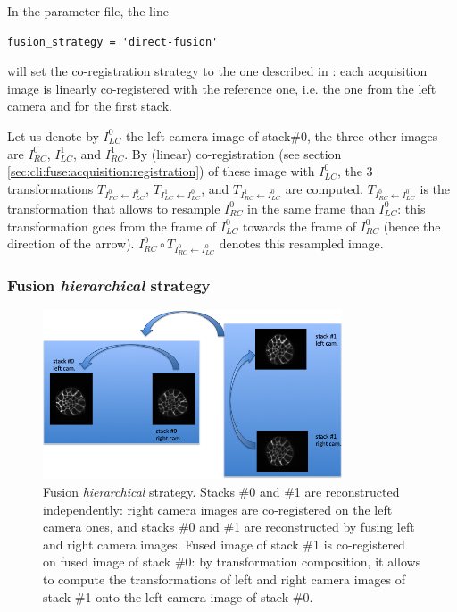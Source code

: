 In the parameter file, the line
\begin{verbatim}
fusion_strategy = 'direct-fusion'
\end{verbatim}
will set the co-registration strategy to the one described in \cite{guignard:tel-01278725,guignard:hal-02903409}: each acquisition image is linearly co-registered with the reference one, i.e. the one from the left camera and for the first stack.

Let us denote by $I^{0}_{LC}$ the left camera image of stack\#0, the three other images are $I^{0}_{RC}$, $I^{1}_{LC}$, and $I^{1}_{RC}$. By (linear) co-registration (see section \ref{sec:cli:fuse:acquisition:registration}) of these image with $I^{0}_{LC}$, the 3 transformations
$T_{I^{0}_{RC} \leftarrow I^{0}_{LC}}$,
$T_{I^{1}_{LC} \leftarrow I^{0}_{LC}}$, and
$T_{I^{1}_{RC} \leftarrow I^{0}_{LC}}$
are computed.
$T_{I^{0}_{RC} \leftarrow I^{0}_{LC}}$ is the transformation that allows to resample $I^{0}_{RC}$ in the same frame than $I^{0}_{LC}$: this transformation goes from the frame of $I^{0}_{LC}$ towards the frame of $I^{0}_{RC}$ (hence the direction of the arrow).
$I^{0}_{RC} \circ T_{I^{0}_{RC} \leftarrow I^{0}_{LC}}$ denotes this resampled image.


\subsubsection{Fusion \textit{hierarchical} strategy}

\begin{figure}
\begin{center}
\includegraphics[height=50mm]{figures/fusion-hierarchical-strategy.png}  
\end{center}
\caption{\label{fig:cli:fuse:hierarchical:strategy} Fusion \textit{hierarchical} strategy. Stacks \#0 and \#1 are reconstructed independently: right camera images are co-registered on the left camera ones, and stacks \#0 and \#1 are reconstructed by fusing left and right camera images. Fused image of stack \#1 is co-registered on fused image of stack \#0: by transformation composition, it allows to compute the transformations of left and right camera images of stack \#1 onto the left camera image of stack \#0.}
\end{figure}

